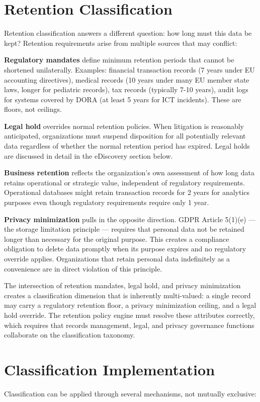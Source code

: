 \section{Retention Classification}
Retention classification answers a different question: how long must this data be kept? Retention requirements arise from multiple sources that may conflict:

\textbf{Regulatory mandates} define minimum retention periods that cannot be shortened unilaterally. Examples: financial transaction records (7 years under EU accounting directives), medical records (10 years under many EU member state laws, longer for pediatric records), tax records (typically 7-10 years), audit logs for systems covered by DORA (at least 5 years for ICT incidents). These are floors, not ceilings.

\textbf{Legal hold} overrides normal retention policies. When litigation is reasonably anticipated, organizations must suspend disposition for all potentially relevant data regardless of whether the normal retention period has expired. Legal holds are discussed in detail in the eDiscovery section below.

\textbf{Business retention} reflects the organization's own assessment of how long data retains operational or strategic value, independent of regulatory requirements. Operational databases might retain transaction records for 2 years for analytics purposes even though regulatory requirements require only 1 year.

\textbf{Privacy minimization} pulls in the opposite direction. GDPR Article 5(1)(e) --- the storage limitation principle --- requires that personal data not be retained longer than necessary for the original purpose. This creates a compliance obligation to delete data promptly when its purpose expires and no regulatory override applies. Organizations that retain personal data indefinitely as a convenience are in direct violation of this principle.

The intersection of retention mandates, legal hold, and privacy minimization creates a classification dimension that is inherently multi-valued: a single record may carry a regulatory retention floor, a privacy minimization ceiling, and a legal hold override. The retention policy engine must resolve these attributes correctly, which requires that records management, legal, and privacy governance functions collaborate on the classification taxonomy.

\section{Classification Implementation}
Classification can be applied through several mechanisms, not mutually exclusive:

